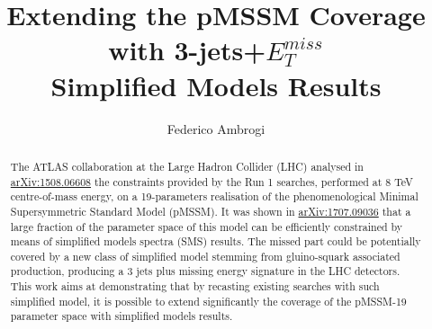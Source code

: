 \documentclass[preprint,number,sort&compress,twocolumn,3p]{elsstyarticle}
\begin{document}
\title{{\boldmath Extending the pMSSM Coverage with 3-jets+$E_T ^{miss}$ \\ Simplified Models Results}}

\date{}
\author[a]{Federico Ambrogi}
\address[a]{University of Vienna, Faculty of Physics, Bolzmanngasse 5, A-1090 Wien, Austria}



\begin{abstract}
The ATLAS collaboration at the Large Hadron Collider (LHC) analysed in \href{https://arxiv.org/abs/1508.06608}{arXiv:1508.06608} the constraints provided by the Run 1 searches, performed at 8 TeV centre-of-mass energy, on a 19-parameters realisation of the phenomenological Minimal Supersymmetric Standard Model (pMSSM). It was shown in \href{https://arxiv.org/abs/1707.09036}{arXiv:1707.09036} that a large fraction of the parameter space of this model can be efficiently constrained by means of simplified models spectra (SMS) results. The missed part could be potentially covered by a new class of simplified model stemming from gluino-squark associated production, producing a 3 jets plus missing energy signature in the LHC detectors. This work aims at demonstrating that by recasting existing searches with such simplified model, it is possible to extend significantly the coverage of the pMSSM-19 parameter space with simplified models results.
\end{abstract}


\maketitle
\setcounter{tocdepth}{1}
\tableofcontents
\end{document}
